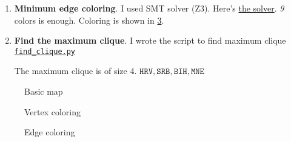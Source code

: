 \documentclass[12pt, a4paper]{article}
\begin{document}
\begin{enumerate}[label=\alph*)]
\item \textbf{Minimum edge coloring}. I used SMT solver (Z3). Here's
\href{https://github.com/ablearthy-itmo-39828cf299f04949c86/discrete-math-2-hw-1/blob/8bc76f0/auto/edge_coloring.py}{the
solver}.
\textit{9} colors is enough. Coloring is shown in \cref{fig:edge_coloring_map}.

\item \textbf{Find the maximum clique}. I wrote the script to find maximum
clique
\href{https://github.com/ablearthy-itmo-39828cf299f04949c86/discrete-math-2-hw-1/blob/1c391015b3b3a8822ac5e7c6f949004ca919e267/auto/find_clique.py}{\texttt{find\_clique.py}}

The maximum clique is of size 4.
\(\texttt{HRV}, \texttt{SRB}, \texttt{BIH}, \texttt{MNE}\)


\end{enumerate}



\begin{landscape}
\begin{figure}
\centering

\caption{Basic map}\label{fig:map_basic}
\end{figure}
\end{landscape}

\begin{landscape}
\begin{figure}
\centering

\caption{Vertex coloring}\label{fig:vertex_coloring_map}
\end{figure}
\end{landscape}

\begin{landscape}
\begin{figure}
\centering

\caption{Edge coloring}\label{fig:edge_coloring_map}
\end{figure}
\end{landscape}
\end{document}
